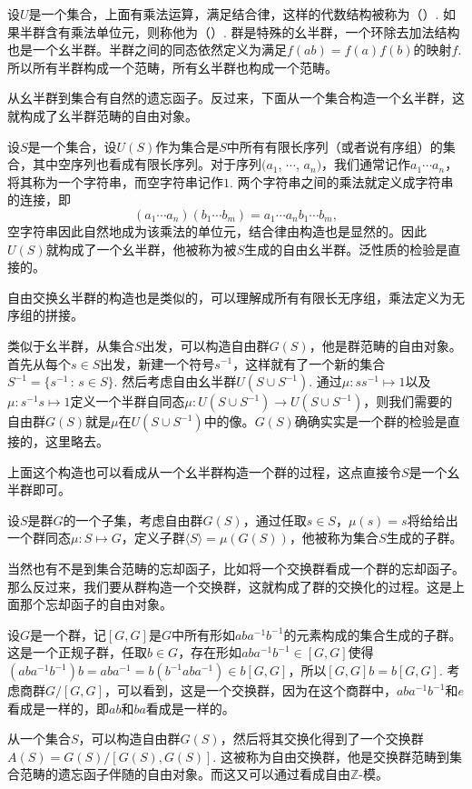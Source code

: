 \para 设$U$是一个集合，上面有乘法运算，满足结合律，这样的代数结构被称为（）. 如果半群含有乘法单位元，则称他为（）. 群是特殊的幺半群，一个环除去加法结构也是一个幺半群。半群之间的同态依然定义为满足$f(ab)=f(a)f(b)$的映射$f$. 所以所有半群构成一个范畴，所有幺半群也构成一个范畴。

从幺半群到集合有自然的遗忘函子。反过来，下面从一个集合构造一个幺半群，这就构成了幺半群范畴的自由对象。

设$S$是一个集合，设$U(S)$作为集合是$S$中所有有限长序列（或者说有序组）的集合，其中空序列也看成有限长序列。对于序列$(a_1$, $\cdots$, $a_n)$，我们通常记作$a_1\cdots a_n$，将其称为一个字符串，而空字符串记作$1$. 两个字符串之间的乘法就定义成字符串的连接，即
\[
	(a_1\cdots a_n)(b_1\cdots b_m)=a_1\cdots a_nb_1\cdots b_m,
\]
空字符串因此自然地成为该乘法的单位元，结合律由构造也是显然的。因此$U(S)$就构成了一个幺半群，他被称为被$S$生成的自由幺半群。泛性质的检验是直接的。

自由交换幺半群的构造也是类似的，可以理解成所有有限长无序组，乘法定义为无序组的拼接。

\para 类似于幺半群，从集合$S$出发，可以构造自由群$G(S)$，他是群范畴的自由对象。首先从每个$s\in S$出发，新建一个符号$s^{-1}$，这样就有了一个新的集合$S^{-1}=\{s^{-1}\,:\, s\in S\}$. 然后考虑自由幺半群$U(S\cup S^{-1})$. 通过$\mu: ss^{-1}\mapsto 1$以及$\mu: s^{-1}s\mapsto 1$定义一个半群自同态$\mu:U(S\cup S^{-1})\to U(S\cup S^{-1})$，则我们需要的自由群$G(S)$就是$\mu$在$U(S\cup S^{-1})$中的像。$G(S)$确确实实是一个群的检验是直接的，这里略去。

上面这个构造也可以看成从一个幺半群构造一个群的过程，这点直接令$S$是一个幺半群即可。

\para 设$S$是群$G$的一个子集，考虑自由群$G(S)$，通过任取$s\in S$，$\mu(s)=s$将给给出一个群同态$\mu:S\mapsto G$，定义子群$\langle S\rangle=\mu(G(S))$，他被称为集合$S$生成的子群。

\para 当然也有不是到集合范畴的忘却函子，比如将一个交换群看成一个群的忘却函子。那么反过来，我们要从群构造一个交换群，这就构成了群的交换化的过程。这是上面那个忘却函子的自由对象。

设$G$是一个群，记$[G,G]$是$G$中所有形如$aba^{-1}b^{-1}$的元素构成的集合生成的子群。这是一个正规子群，任取$b\in G$，存在形如$aba^{-1}b^{-1}\in [G,G]$使得$(aba^{-1}b^{-1})b=aba^{-1}=b(b^{-1}aba^{-1})\in b[G,G]$，所以$[G,G]b=b[G,G]$. 考虑商群$G/[G,G]$，可以看到，这是一个交换群，因为在这个商群中，$aba^{-1}b^{-1}$和$e$看成是一样的，即$ab$和$ba$看成是一样的。

从一个集合$S$，可以构造自由群$G(S)$，然后将其交换化得到了一个交换群$A(S)=G(S)/[G(S),G(S)]$. 这被称为自由交换群，他是交换群范畴到集合范畴的遗忘函子伴随的自由对象。而这又可以通过看成自由$\mathbb{Z}$-模。

